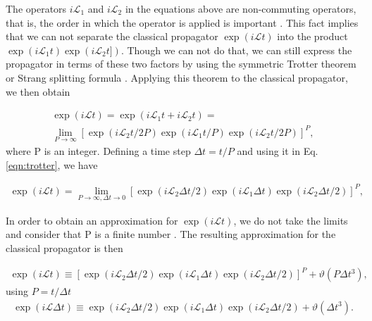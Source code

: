 The operators $i\mathcal{L}_{1}$ and $i\mathcal{L}_{2}$ in the equations above are non-commuting operators, that is, the order in which the operator is applied is important \cite{tuckerman}. This fact implies that we can not separate the classical propagator $\exp (i\mathcal{L}t)$  into the product $\exp (i\mathcal{L}_{1}t) \exp (i\mathcal{L}_{2}t])$. Though we can not do that, we can still express the propagator in terms of these two factors by using the symmetric Trotter theorem or Strang splitting formula \cite{trotter,strang}. Applying this theorem to the classical propagator, we then obtain

\begin{equation}
\begin{aligned}
\exp (i\mathcal{L}t)  = \exp (i\mathcal{L}_{1}t + i\mathcal{L}_{2}t) = \\
\lim\limits_{P \rightarrow \infty} \left [ \exp (i\mathcal{L}_{2}t/2P) \exp (i\mathcal{L}_{1}t/P) \exp (i\mathcal{L}_{2}t/2P) \right ]^{P},
\end{aligned}
\label{eqn:trotter}
\end{equation}
where P is an integer. Defining a time step $\Delta t =t/P$ and using it in Eq. \ref{eqn:trotter}, we have

\begin{equation}
\begin{aligned}
\exp (i\mathcal{L}t)  = 
\lim\limits_{P \rightarrow \infty, \Delta t \rightarrow 0} \left [ \exp (i\mathcal{L}_{2} \Delta t/2) \exp (i\mathcal{L}_{1} \Delta t) \exp (i\mathcal{L}_{2} \Delta t/2) \right ]^{P},
\end{aligned}
\label{eqn:trotterdt}
\end{equation}

In order to obtain an approximation for $\exp (i\mathcal{L}t)$, we do not take the limits and consider that P is a finite number \cite{tuckerman}. The resulting approximation for the classical propagator is then 

\begin{equation}
\begin{aligned}
\exp (i\mathcal{L}t)  \equiv
\left [ \exp (i\mathcal{L}_{2} \Delta t/2) \exp (i\mathcal{L}_{1} \Delta t) \exp (i\mathcal{L}_{2} \Delta t/2) \right ]^{P} + \vartheta (P \Delta t^{3}),
\end{aligned}
\end{equation}
using $P= t/\Delta t$
\begin{equation}
\begin{aligned}
\exp (i\mathcal{L} \Delta t)  \equiv
\exp (i\mathcal{L}_{2} \Delta t/2) \exp (i\mathcal{L}_{1} \Delta t) \exp (i\mathcal{L}_{2} \Delta t/2)  + \vartheta (\Delta t^{3}).
\end{aligned}
\label{eqn:trotterfin}
\end{equation}  


